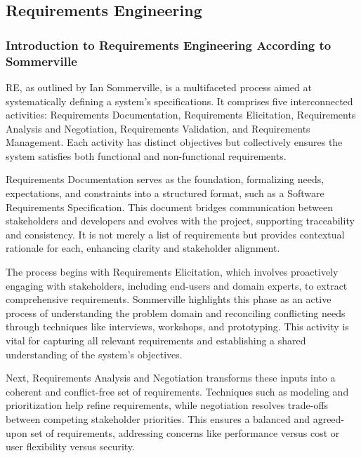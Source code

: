 \subsection{Requirements Engineering}\label{subsec:requirements-engineering}

\subsubsection{Introduction to Requirements Engineering According to Sommerville}

\ac{RE}, as outlined by Ian Sommerville, is a multifaceted process aimed at systematically defining a
system’s specifications. \autocite[cf.][p.5]{sommervilleRequirementsEngineeringGood1997} It comprises five interconnected activities: Requirements Documentation, Requirements
Elicitation, Requirements Analysis and Negotiation, Requirements Validation, and Requirements Management.\autocite[cf.][p.11]{sommervilleRequirementsEngineeringGood1997} Each activity
has distinct objectives but collectively ensures the system satisfies both functional and non-functional requirements.\autocite[cf.][p.7--8]{sommervilleRequirementsEngineeringGood1997}

Requirements Documentation serves as the foundation, formalizing needs, expectations, and constraints into a structured
format, such as a Software Requirements Specification. This document bridges communication between stakeholders
and developers and evolves with the project, supporting traceability and consistency. It is not merely a list of
requirements but provides contextual rationale for each, enhancing clarity and stakeholder alignment.\autocite[cf.][38--40]{sommervilleRequirementsEngineeringGood1997}

The process begins with Requirements Elicitation, which involves proactively engaging with stakeholders, including
end-users and domain experts, to extract comprehensive requirements. Sommerville highlights this phase as an active
process of understanding the problem domain and reconciling conflicting needs through techniques like interviews,
workshops, and prototyping. This activity is vital for capturing all relevant requirements and establishing a shared
understanding of the system’s objectives.\autocite[cf.][p.64--65]{sommervilleRequirementsEngineeringGood1997}

Next, Requirements Analysis and Negotiation transforms these inputs into a coherent and conflict-free set of
requirements. Techniques such as modeling and prioritization help refine requirements, while negotiation resolves
trade-offs between competing stakeholder priorities. This ensures a balanced and agreed-upon set of requirements,
addressing concerns like performance versus cost or user flexibility versus security.\autocite[cf.][p.112--113]{sommervilleRequirementsEngineeringGood1997}

